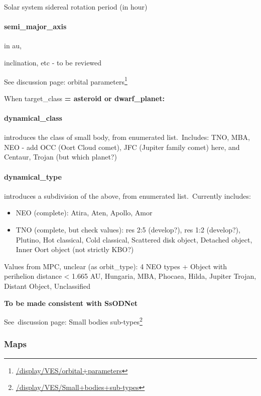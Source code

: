 \documentclass[11pt,a4paper]{ivoa}
\begin{document}
Solar system sidereal rotation period (in hour)

\paragraph{semi\_major\_axis}

in au,

inclination, etc - to be reviewed

See discussion page: orbital parameters\footnote{\url{/display/VES/orbital+parameters}}

When target\_class\textbf{ = asteroid or dwarf\_planet:\\}

\paragraph{dynamical\_class}

introduces the class of small body, from enumerated list. Includes: TNO, MBA, NEO - add OCC (Oort Cloud comet), JFC (Jupiter family comet) here, and Centaur, Trojan (but which planet?)

\paragraph{dynamical\_type}

introduces a subdivision of the above, from enumerated list. Currently includes:

\begin{itemize}
\item NEO (complete): Atira, Aten, Apollo, Amor
\item TNO (complete, but check values): res 2:5 (develop?), res 1:2 (develop?), Plutino, Hot classical, Cold classical, Scattered disk object, Detached object, Inner Oort object (not strictly KBO?)
\end{itemize}

Values from MPC, unclear (as orbit\_type): 4 NEO types + Object with perihelion distance < 1.665 AU, Hungaria, MBA, Phocaea, Hilda, Jupiter Trojan, Distant Object, Unclassified

\textbf{To be made consistent with SsODNet\emph{\\}}

See discussion page: Small bodies sub-types\footnote{\url{/display/VES/Small+bodies+sub-types}}

\subsubsection{Maps\\}
\end{document}
